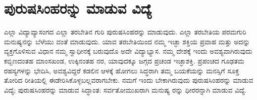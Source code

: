 \section{ಪುರುಷಸಿಂಹರನ್ನು ಮಾಡುವ ವಿದ್ಯೆ}

ಎಲ್ಲಾ ವಿದ್ಯಾವ್ಯಾಸಂಗದ ಎಲ್ಲಾ ತರಬೇತಿನ ಗುರಿ ಪುರುಷಸಿಂಹರನ್ನು ಮಾಡುವುದು. ಎಲ್ಲಾ ತರಬೇತಿಯ ಪರಮಗುರಿ ಮನುಷ್ಯನನ್ನು ಬೆಳೆಯು ವಂತೆ ಮಾಡುವುದು. ಯಾವ ತರಬೇತಿಯಿಂದ ನಮ್ಮ ಇಚ್ಛಾ ಶಕ್ತಿಯ ಪ್ರವಾಹ ಮತ್ತು ಅದನ್ನು ವ್ಯಕ್ತಗೊಳಿಸುವ ವಿಧಾನ ನಮ್ಮ ಸ್ವಾಧೀನಕ್ಕೆ ಬರುವುದೊ ಅದೇ ವಿದ್ಯಾಭ್ಯಾಸ. ನಮ್ಮ ದೇಶಕ್ಕೆ ಇಂದು ಅವಶ್ಯವಾಗಿರುವುದು ಕಬ್ಬಿಣದಂತಹ ಮಾಂಸಖಂಡ, ಉಕ್ಕಿನಂತಹ ನರ, ಯಾವುದಕ್ಕೂ ಜಗ್ಗದ ಪ್ರಚಂಡ ಇಚ್ಛಾಶಕ್ತಿ. ಪ್ರಪಂಚದ ಗೂಢತಮ ರಹಸ್ಯಗಳನ್ನು ಭೇದಿಸಿ, ಅವಶ್ಯವಿದ್ದರೆ ಕಡಲಿನ ಆಳಕ್ಕೆ ಹೋಗಲು ಸಿದ್ಧರಾಗಿ ತಮ್ಮ ಬಯಕೆಯನ್ನು ಮನಸ್ಸಿಗೆ ಸೂಕ್ತ ತೋರಿದ ರೀತಿಯಲ್ಲಿ ಈಡೇರಿಸಿಕೊಳ್ಳಬಲ್ಲವರಾಗಬೇಕು. ನಮಗೆ ಇಂದು ಬೇಕಾಗಿರುವುದು ಪುರುಷಸಿಂಹರನ್ನು ಮಾಡುವ ವಿದ್ಯೆ; ಪುರುಷಸಿಂಹರನ್ನು ಮಾಡುವ ಸಿದ್ಧಾಂತ: ಸರ್ವತೋಮುಖರಾಗಿ ಮನುಷ್ಯ ರನ್ನು ಧೀರರನ್ನಾಗಿ ಮಾಡುವ ವಿದ್ಯೆ.

